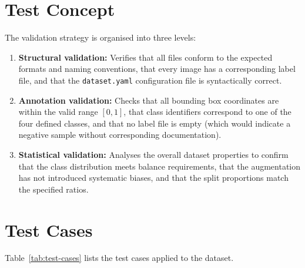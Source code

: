 \documentclass[a4paper,12pt,twoside]{report}
\begin{document}
\section{Test Concept}
\label{sec:test-concept}

The validation strategy is organised into three levels:

\begin{enumerate}
  \item \textbf{Structural validation:} Verifies that all files conform to the
    expected formats and naming conventions, that every image has a corresponding
    label file, and that the \texttt{dataset.yaml} configuration file is
    syntactically correct.

  \item \textbf{Annotation validation:} Checks that all bounding box coordinates
    are within the valid range $[0, 1]$, that class identifiers correspond to one
    of the four defined classes, and that no label file is empty (which would
    indicate a negative sample without corresponding documentation).

  \item \textbf{Statistical validation:} Analyses the overall dataset properties
    to confirm that the class distribution meets balance requirements, that the
    augmentation has not introduced systematic biases, and that the split
    proportions match the specified ratios.
\end{enumerate}

\section{Test Cases}
\label{sec:test-cases}

Table~\ref{tab:test-cases} lists the test cases applied to the dataset.
\end{document}
